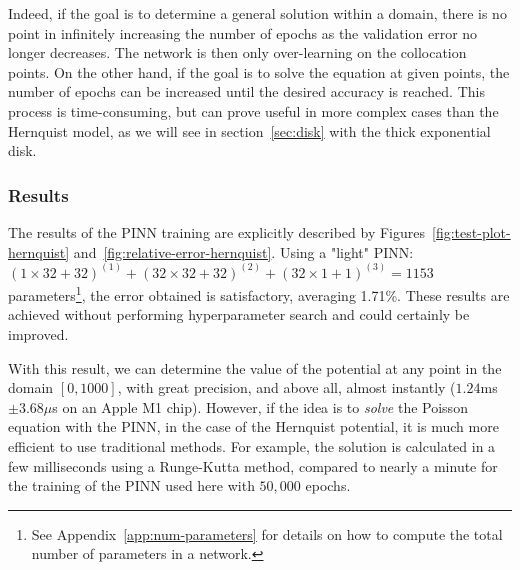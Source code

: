 Indeed, if the goal is to determine a general solution within a domain, there is no point in infinitely increasing the number of epochs as the validation error no longer decreases. The network is then only over-learning on the collocation points. On the other hand, if the goal is to solve the equation at given points, the number of epochs can be increased until the desired accuracy is reached. This process is time-consuming, but can prove useful in more complex cases than the Hernquist model, as we will see in section~\ref{sec:disk} with the thick exponential disk.

\subsubsection{Results}

The results of the PINN training are explicitly described by Figures~\ref{fig:test-plot-hernquist} and~\ref{fig:relative-error-hernquist}. Using a "light" PINN: $(1 \times 32 + 32)^{(1)} + (32 \times 32 + 32)^{(2)} + (32 \times 1+ 1)^{(3)} = 1153$ parameters\footnote{See Appendix~\ref{app:num-parameters} for details on how to compute the total number of parameters in a network.}, the error obtained is satisfactory, averaging 1.71\%. These results are achieved without performing hyperparameter search and could certainly be improved.

With this result, we can determine the value of the potential at any point in the domain $[0, 1000]$, with great precision, and above all, almost instantly ($1.24$ms $\pm 3.68 \mu $s on an Apple M1 chip). However, if the idea is to \emph{solve} the Poisson equation with the PINN, in the case of the Hernquist potential, it is much more efficient to use traditional methods. For example, the solution is calculated in a few milliseconds using a Runge-Kutta method, compared to nearly a minute for the training of the PINN used here with $50,000$ epochs.

